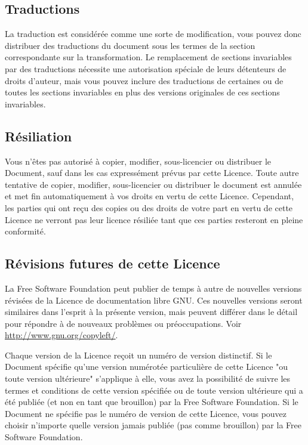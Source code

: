 	\subsection{Traductions}
	La traduction est considérée comme une sorte de modification, vous pouvez donc distribuer des traductions du document sous les termes de la section correspondante sur la transformation. Le remplacement de sections invariables par des traductions nécessite une autorisation spéciale de leurs détenteurs de droits d'auteur, mais vous pouvez inclure des traductions de certaines ou de toutes les sections invariables en plus des versions originales de ces sections invariables.

	\subsection{Résiliation}
	Vous n'êtes pas autorisé à copier, modifier, sous-licencier ou distribuer le Document, sauf dans les cas expressément prévus par cette Licence. Toute autre tentative de copier, modifier, sous-licencier ou distribuer le document est annulée et met fin automatiquement à vos droits en vertu de cette Licence. Cependant, les parties qui ont reçu des copies ou des droits de votre part en vertu de cette Licence ne verront pas leur licence résiliée tant que ces parties resteront en pleine conformité.

	\subsection{Révisions futures de cette Licence}
	La Free Software Foundation peut publier de temps à autre de nouvelles versions révisées de la Licence de documentation libre GNU. Ces nouvelles versions seront similaires dans l'esprit à la présente version, mais peuvent différer dans le détail pour répondre à de nouveaux problèmes ou préoccupations. Voir \href{http://www.gnu.org/copyleft/}{{\color{blue} http://www.gnu.org/copyleft/}}.

	Chaque version de la Licence reçoit un numéro de version distinctif. Si le Document spécifie qu'une version numérotée particulière de cette Licence "ou toute version ultérieure" s'applique à elle, vous avez la possibilité de suivre les termes et conditions de cette version spécifiée ou de toute version ultérieure qui a été publiée (et non en tant que brouillon) par la Free Software Foundation. Si le Document ne spécifie pas le numéro de version de cette Licence, vous pouvez choisir n'importe quelle version jamais publiée (pas comme brouillon) par la Free Software Foundation.
	
